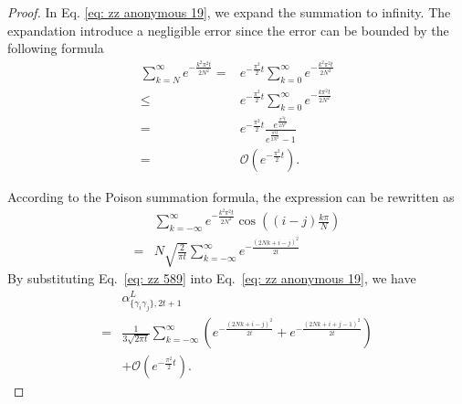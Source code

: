 \documentclass[journal=jctcce,a4paper,manuscript=article]{achemso}
\newcommand{\alpl}{\alpha_{\{\gamma_i\gamma_j\}, 2t+1}^{L}}
\begin{document}
\begin{proof}
  In Eq. \eqref{eq: zz anonymous 19}, we expand the summation to infinity. The expandation introduce a negligible error since the error can be bounded by the following formula
  \begin{align*}
    \sum_{k=N}^{\infty} e^{-\frac{k^2 \pi^2 t}{2 N^2}} = & e^{-\frac{\pi^2}{2}t}\sum_{k=0}^{\infty} e^{-\frac{k^2 \pi^2 t}{2 N^2}}               \\
    \leq                                                 & e^{-\frac{\pi^2}{2}t}\sum_{k=0}^{\infty} e^{-\frac{k \pi^2 t}{2 N^2}}                 \\
    =                                                    & e^{-\frac{\pi^2}{2}t} \frac{e^{\frac{\pi^2 t}{2 N^2}}}{e^{\frac{\pi^2 t}{2 N^2}} -1 } \\
    =                                                    & \mathcal{O}\left(e^{-\frac{\pi^2}{2}t}\right).
  \end{align*}

  According to the Poison summation formula, the expression can be rewritten as
  \begin{equation}
    \begin{aligned}
        & \sum_{k=-\infty}^{\infty} e^{-\frac{k^2 \pi^2 t}{2 N^2}}\cos \left((i-j) \frac{k \pi}{N}\right) \\
      = & N\sqrt{\frac{2}{\pi t}}\sum_{k=-\infty}^{\infty} e^{-\frac{(2Nk+i-j)^2}{2t}}
    \end{aligned}
    \label{eq: zz 589}
  \end{equation}
  By substituting Eq.~\eqref{eq: zz 589} into Eq.~\eqref{eq: zz anonymous 19}, we have
  \begin{align}
      & \alpl                                                                                                                         \\
    = & \frac{1}{3\sqrt{2\pi t}}  \sum_{k=-\infty}^{\infty} \left(e^{-\frac{(2Nk+i-j)^2}{2t}} + e^{-\frac{(2Nk+i+j-1)^2}{2t}} \right) \\
      & +\mathcal{O}\left(e^{-\frac{\pi^2}{2}t}\right).
  \end{align}

\end{proof}
\end{document}
